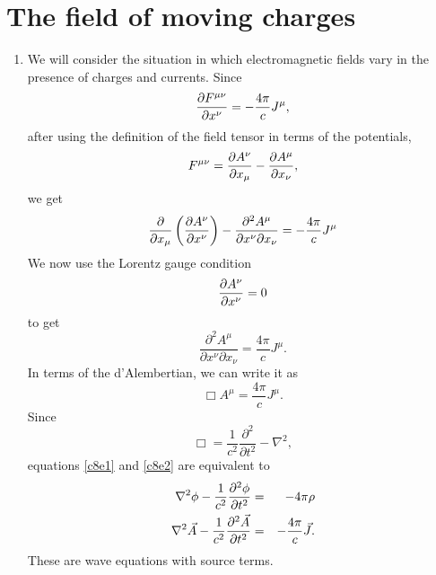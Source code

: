 \chapter{The field of moving charges}\label{c8}
\begin{enumerate}
\item We will consider the situation in which electromagnetic fields vary in the
presence of charges and currents. Since
\[
\frac{\partial{F^{\mu\nu}}}{\partial{x^\nu}} = -\frac{4\pi}{c}J^\mu,
\]
after using the definition of the field tensor in terms of the potentials,
\[
F^{\mu\nu} = \frac{\partial{A^\nu}}{\partial{x_\mu}} - \frac{\partial{A^\mu}}{\partial{x_\nu}},
\]
we get
\[
\frac{\partial}{\partial x_\mu}\left(\frac{\partial{A^\nu}}{\partial{x^\nu}}\right) - 
\frac{\partial^2 A^\mu}{\partial x^\nu \partial x_\nu} = -\frac{4\pi}{c}J^\mu
\]
We now use the Lorentz gauge condition
\[
\frac{\partial{A^\nu}}{\partial{x^\nu}} = 0
\]
to get
\begin{equation}\label{c8e1}
\frac{\partial^2 A^\mu}{\partial x^\nu \partial x_\nu} = \frac{4\pi}{c}J^\mu.
\end{equation}
In terms of the d'Alembertian, we can write it as
\begin{equation}\label{c8e2}
\Box A^\mu = \frac{4\pi}{c}J^\mu.
\end{equation}
Since
\[
\Box = \frac{1}{c^2}\frac{\partial^2}{\partial t^2} - \nabla^2,
\]
equations \eqref{c8e1} and \eqref{c8e2} are equivalent to
\begin{eqnarray}
\nabla^2\phi - \frac{1}{c^2}\frac{\partial^2{\phi}}{\partial{t}^2} &=& -4\pi\rho \label{c8e3} \\
\nabla^2\vec{A} - \frac{1}{c^2}\frac{\partial^2{\vec{A}}}{\partial{t}^2} &=& 
-\frac{4\pi}{c}\vec{J}. \label{c8e4}
\end{eqnarray}
These are wave equations with source terms.
\end{enumerate}
